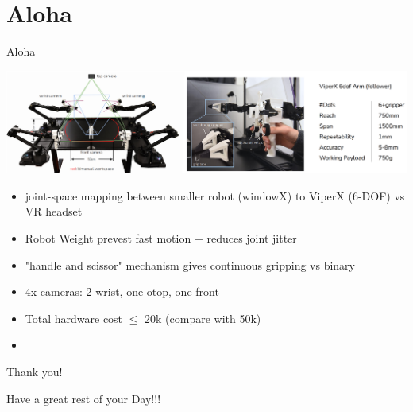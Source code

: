 \documentclass{beamer}
\begin{document}
\section{Aloha}
\begin{frame}[t]{Aloha}
    \begin{center}
        \includegraphics[width=1.0\textwidth]{./img/aloha_hw.png}
    \end{center}
    \begin{itemize}[label=-]
        \item joint-space mapping between smaller robot (windowX) to ViperX (6-DOF) vs VR headset
        \item Robot Weight prevest fast motion + reduces joint jitter 
        \item "handle and scissor" mechanism gives continuous gripping vs binary
        \item 4x cameras: 2 wrist, one otop, one front
        \item Total hardware cost $\leq$ 20k (compare with 50k)
        \item 
    
    \end{itemize}
\end{frame}

\begin{frame}{Thank you!}
	\begin{center}
        Have a great rest of your Day!!!
	\end{center}
	\begin{center}
	\end{center}
\end{frame}
\end{document}
